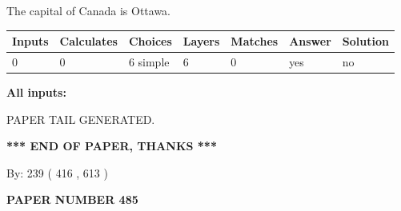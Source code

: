 \documentclass[12pt]{article}
\begin{document}
 
The capital of Canada is Ottawa.
 
 
\noindent{}
 
 
   
   
   
   
\noindent\begin{tabular}{|l|l|l|l|l|l|l|}
 \hline
Inputs & Calculates & Choices & Layers & Matches & Answer & Solution \\ \hline
 0  & 
 0  & 
 6
  simple  
  & 
 6  & 
 0  & 
  yes & 
  no 
  \\ \hline
 \end{tabular}
   
   
   
   
\noindent{}
   
   
   
   
\noindent\vspace{0.1in}\hspace{-0.08in} {\textbf{\Large{All inputs: }}}
   
   
   
   
   
   
 \vspace{0.2in}
 
   
   
\vspace{2.0in} PAPER TAIL GENERATED.
   
   
   
   
\vspace{1.0in} 
{\textbf{\large{ *** END OF PAPER, THANKS *** }}} 
   
   
\hspace{1.0in} By: 
 239 ( 416 ,  613 )
   
   
   
   
\newpage 
\setcounter{page}{ 
   485001 } 
   
   
   
   
 {\textbf{ \Large{ PAPER NUMBER  485  }}}
   
   
\vspace{0.2in}
   
   
   
   
   
   
   
\end{document}
